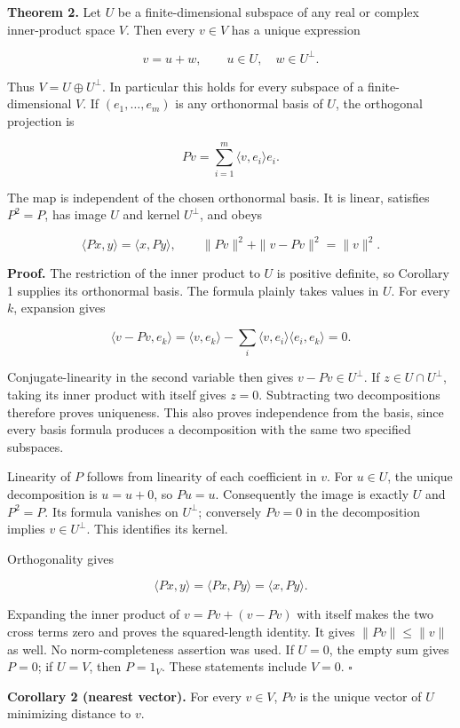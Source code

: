 \documentclass[
  english,
]{article}
\begin{document}
\textbf{Theorem 2.} Let \(U\) be a finite-dimensional subspace of any
real or complex inner-product space \(V\). Then every \(v\in V\) has a
unique expression

\[
v=u+w,\qquad u\in U,\quad w\in U^\perp.
\]

Thus \(V=U\oplus U^\perp\). In particular this holds for every subspace
of a finite-dimensional \(V\). If \((e_1,\ldots,e_m)\) is any
orthonormal basis of \(U\), the orthogonal projection is

\[
Pv=\sum_{i=1}^m\langle v,e_i\rangle e_i.
\]

The map is independent of the chosen orthonormal basis. It is linear,
satisfies \(P^2=P\), has image \(U\) and kernel \(U^\perp\), and obeys

\[
\langle Px,y\rangle=\langle x,Py\rangle,
\qquad \|Pv\|^2+\|v-Pv\|^2=\|v\|^2.
\]

\textbf{Proof.} The restriction of the inner product to \(U\) is
positive definite, so Corollary 1 supplies its orthonormal basis. The
formula plainly takes values in \(U\). For every \(k\), expansion gives

\[
\langle v-Pv,e_k\rangle
=\langle v,e_k\rangle-\sum_i\langle v,e_i\rangle\langle e_i,e_k\rangle=0.
\]

Conjugate-linearity in the second variable then gives
\(v-Pv\in U^\perp\). If \(z\in U\cap U^\perp\), taking its inner product
with itself gives \(z=0\). Subtracting two decompositions therefore
proves uniqueness. This also proves independence from the basis, since
every basis formula produces a decomposition with the same two specified
subspaces.

Linearity of \(P\) follows from linearity of each coefficient in \(v\).
For \(u\in U\), the unique decomposition is \(u=u+0\), so \(Pu=u\).
Consequently the image is exactly \(U\) and \(P^2=P\). Its formula
vanishes on \(U^\perp\); conversely \(Pv=0\) in the decomposition
implies \(v\in U^\perp\). This identifies its kernel.

Orthogonality gives

\[
\langle Px,y\rangle=\langle Px,Py\rangle=\langle x,Py\rangle.
\]

Expanding the inner product of \(v=Pv+(v-Pv)\) with itself makes the two
cross terms zero and proves the squared-length identity. It gives
\(\|Pv\|\le\|v\|\) as well. No norm-completeness assertion was used. If
\(U=0\), the empty sum gives \(P=0\); if \(U=V\), then \(P=1_V\). These
statements include \(V=0\). \(\square\)

\textbf{Corollary 2 (nearest vector).} For every \(v\in V\), \(Pv\) is
the unique vector of \(U\) minimizing distance to \(v\).
\end{document}
